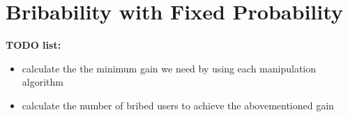
\section{Bribability with Fixed Probability}
\label{section:fixed_voters}

\noindent
\textbf{TODO list:}
\begin{itemize}
\item calculate the the minimum gain we need by using each manipulation algorithm
\item calculate the number of bribed users to achieve the abovementioned gain
\end{itemize}